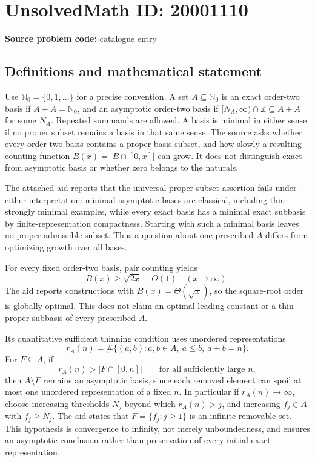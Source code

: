 \documentclass[11pt]{article}
\newcommand{\N}{\mathbb{N}}
\newcommand{\Z}{\mathbb{Z}}
\begin{document}
\section*{UnsolvedMath ID: 20001110}
\textbf{Source problem code:} catalogue entry
\subsection{Definitions and mathematical statement}
Use $\N_0=\{0,1,\ldots\}$ for a precise convention. A set $A\subseteq\N_0$ is an exact order-two basis if $A+A=\N_0$, and an asymptotic order-two basis if $[N_A,\infty)\cap\Z\subseteq A+A$ for some $N_A$. Repeated summands are allowed. A basis is minimal in either sense if no proper subset remains a basis in that same sense. The source asks whether every order-two basis contains a proper basis subset, and how slowly a resulting counting function $B(x)=|B\cap[0,x]|$ can grow. It does not distinguish exact from asymptotic basis or whether zero belongs to the naturals.

The attached aid reports that the universal proper-subset assertion fails under either interpretation: minimal asymptotic bases are classical, including thin strongly minimal examples, while every exact basis has a minimal exact subbasis by finite-representation compactness. Starting with such a minimal basis leaves no proper admissible subset. Thus a question about one prescribed $A$ differs from optimizing growth over all bases.

For every fixed order-two basis, pair counting yields
\[
B(x)\ge\sqrt{2x}-O(1)\quad(x\to\infty).
\]
The aid reports constructions with $B(x)=\Theta(\sqrt x)$, so the square-root order is globally optimal. This does not claim an optimal leading constant or a thin proper subbasis of every prescribed $A$.

Its quantitative sufficient thinning condition uses unordered representations
\[
r_A(n)=\#\{(a,b):a,b\in A,\ a\le b,\ a+b=n\}.
\]
For $F\subseteq A$, if
\[
r_A(n)>|F\cap[0,n]|\qquad\text{for all sufficiently large }n,
\]
then $A\setminus F$ remains an asymptotic basis, since each removed element can spoil at most one unordered representation of a fixed $n$. In particular if $r_A(n)\to\infty$, choose increasing thresholds $N_j$ beyond which $r_A(n)>j$, and increasing $f_j\in A$ with $f_j\ge N_j$. The aid states that $F=\{f_j:j\ge1\}$ is an infinite removable set. This hypothesis is convergence to infinity, not merely unboundedness, and ensures an asymptotic conclusion rather than preservation of every initial exact representation.
\end{document}

